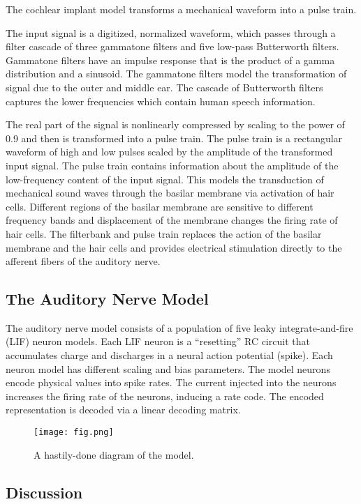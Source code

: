 \documentclass[12pt]{diazessay} %
\begin{document}
The cochlear implant model transforms a
mechanical waveform into a pulse train.

The input signal is a digitized, normalized waveform,
which passes through a filter cascade
of three gammatone filters and five low-pass Butterworth filters.
Gammatone filters have an impulse response that is the product
of a gamma distribution and a sinusoid.
The gammatone filters model the transformation of signal
due to the outer and middle ear.
The cascade of Butterworth filters captures the lower frequencies
which contain human speech information.

The real part of the signal is nonlinearly compressed by scaling
to the power of 0.9 and then is transformed into a pulse train.
The pulse train is a rectangular waveform of high and low pulses
scaled by the amplitude of the transformed input signal.
The pulse train contains information about the amplitude of the low-frequency content
of the input signal.
This models the transduction of mechanical sound waves through the basilar membrane
via activation of hair cells.
Different regions of the basilar membrane are sensitive to different frequency bands
and displacement of the membrane changes the firing rate of hair cells.
The filterbank and pulse train replaces the action of the basilar membrane and the hair cells
and provides electrical stimulation directly to the afferent fibers of the auditory nerve.

\subsection*{The Auditory Nerve Model}

The auditory nerve model consists of a population
of five leaky integrate-and-fire (LIF) neuron models.
Each LIF neuron is a ``resetting'' RC circuit
that accumulates charge and discharges in
a neural action potential (spike).
Each neuron model has different scaling and bias
parameters.
The model neurons encode physical values into spike rates.
The current injected into the neurons
increases the firing rate of the neurons,
inducing a rate code.
The encoded representation is decoded via a linear decoding matrix.

\begin{figure}[ht]
    \centering
    \texttt{[image: fig.png]}
    \caption{A hastily-done diagram of the model.}
\end{figure}

\subsection*{Discussion}
\end{document}
